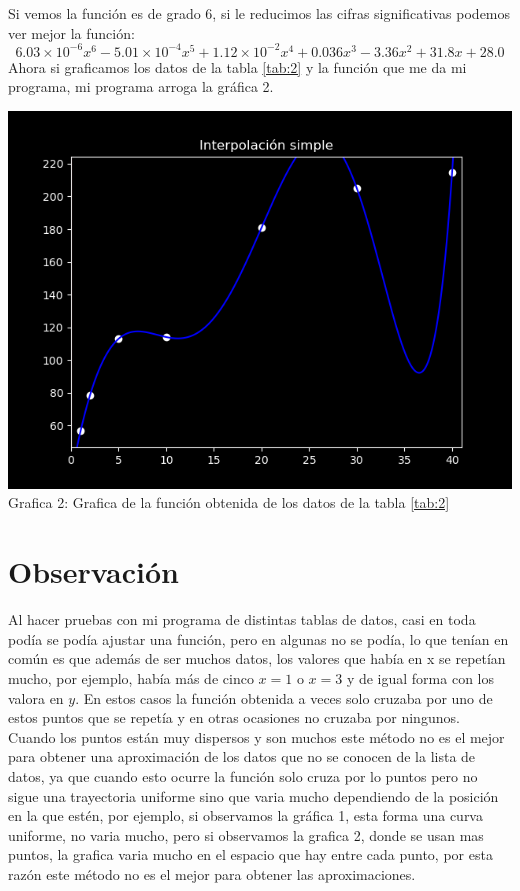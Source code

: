 \documentclass[12pt]{article}
\begin{document}
			Si vemos la función es de grado 6, si le reducimos las cifras significativas podemos ver mejor la función:
			$$ 6.03 \times 10^{-6} x^6 - 5.01 \times 10^{-4} x^5 + 1.12 \times 10^{-2} x^4 + 0.036 x^3 - 3.36 x^2 + 31.8 x + 28.0 $$
			Ahora si graficamos los datos de la tabla \ref{tab:2} y la función que me da mi programa, mi programa arroga la gráfica 2.
			\begin{center}
				\includegraphics[width=.9\linewidth]{Grafica 2.png}\\
				Grafica 2: Grafica de la función obtenida de los datos de la tabla \ref{tab:2}
			\end{center}
		\section*{\centering Observación}\label{sec:Observacion}
			Al hacer pruebas con mi programa de distintas tablas de datos, casi en toda podía se podía ajustar 
			una función, pero en algunas no se podía, lo que tenían en común es que además de ser muchos datos, 
			los valores que había en x se repetían mucho, por ejemplo, había más de cinco $ x = 1 $ o $ x = 3 $ 
			y de igual forma con los valora en $ y $. En estos casos la función obtenida a veces solo cruzaba 
			por uno de estos puntos que se repetía y en otras ocasiones no cruzaba por ningunos.\\
			Cuando los puntos están muy dispersos y son muchos este método no es el mejor para obtener 
			una aproximación de los datos que no se conocen de la lista de datos, ya que cuando esto 
			ocurre la función solo cruza por lo puntos pero no sigue una trayectoria uniforme sino que varia mucho 
			dependiendo de la posición en la que estén, por ejemplo, si observamos la gráfica 1, esta forma 
			una curva uniforme, no varia mucho, pero si observamos la grafica 2, donde se usan mas puntos, 
			la grafica varia mucho en el espacio que hay entre cada punto, por esta razón este método no 
			es el mejor para obtener las aproximaciones.
\end{document}
